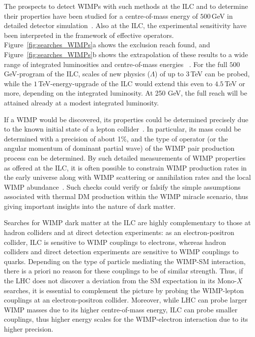 The prospects to detect WIMPs with such methods at the ILC and to determine their properties 
have been studied
for a centre-of-mass energy of $500$\,GeV
in detailed detector simulation~\cite{Bartels:2012ex,Habermehl:417605}. 
Also at the ILC, the experimental sensitivity have been interpreted 
in the framework of effective
operators.
Figure~\ref{fig:searches_WIMPs}a shows the exclusion reach found, and 
Figure~\ref{fig:searches_WIMPs}b shows the extrapolation of these
results to a wide range of integrated luminosities and centre-of-mass energies 
~\cite{Habermehl:417605}.
For the full $500$\,GeV-program of the ILC, scales of new physics ($\Lambda$) 
of up to $3$\,TeV  can be probed,
while the $1$\,TeV-energy-upgrade of the ILC would extend this even 
to $4.5$\,TeV or more, 
depending on the integrated luminosity.
At 250 GeV, 
the full reach will be attained already at a modest integrated luminosity.

If a WIMP would be discovered, 
its properties could be determined precisely due to the known initial
state of a lepton collider~\cite{Bartels:2012ex}. 
In particular, 
its mass could be determined with a precision of about 1\%, and the type of operator 
(or the angular momentum of dominant partial wave) of the WIMP pair production 
process can be determined. 
By such detailed measurements of WIMP properties as offered at the ILC, 
it is often possible to constrain WIMP
production rates in the early universe along with WIMP scattering or annihilation
rates and the local WIMP abundance~\cite{Baltz:2006fm}. 
Such checks could verify or falsify the simple assumptions 
associated with thermal DM production within the WIMP miracle scenario, 
thus giving important insights into the nature of dark matter.

Searches for WIMP dark matter at the ILC are highly complementary to those
at hadron colliders and at direct detection experiments: 
as an electron-positron collider, 
ILC is sensitive to WIMP couplings to electrons, 
whereas hadron colliders and direct detection experiments are sensitive to WIMP 
couplings to quarks. 
Depending on the
type of particle mediating the WIMP-SM interaction, 
there is a priori no reason for these couplings to be of similar strength.
Thus, 
if the LHC does not discover a deviation from the SM expectation 
in its Mono-$X$ searches, 
it is essential to complement the picture by probing 
the WIMP-lepton couplings at an electron-positron collider.
Moreover, 
while LHC can probe larger WIMP masses due to its higher centre-of-mass energy, 
ILC can probe smaller couplings, thus higher energy scales for the 
WIMP-electron interaction due to its higher precision. 


